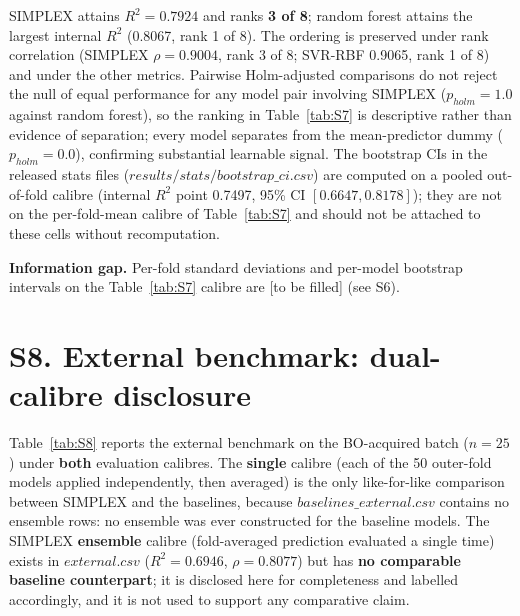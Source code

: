 \documentclass[utf8]{frontiers_suppmat}
\begin{document}
SIMPLEX attains $R^2 = 0.7924$ and ranks \textbf{3 of 8}; random forest attains the largest internal $R^2$ (0.8067, rank 1 of 8). The ordering is preserved under rank correlation (SIMPLEX $\rho = 0.9004$, rank 3 of 8; SVR-RBF 0.9065, rank 1 of 8) and under the other metrics. Pairwise Holm-adjusted comparisons do not reject the null of equal performance for any model pair involving SIMPLEX ($p_{holm} = 1.0$ against random forest), so the ranking in Table~\ref{tab:S7} is descriptive rather than evidence of separation; every model separates from the mean-predictor dummy ($p_{holm} = 0.0$), confirming substantial learnable signal. The bootstrap CIs in the released stats files ($results/stats/bootstrap\_ci.csv$) are computed on a pooled out-of-fold calibre (internal $R^2$ point 0.7497, 95\% CI $[0.6647, 0.8178]$); they are not on the per-fold-mean calibre of Table~\ref{tab:S7} and should not be attached to these cells without recomputation.

\textbf{Information gap.} Per-fold standard deviations and per-model bootstrap intervals on the Table~\ref{tab:S7} calibre are {[}to be filled{]} (see S6).

\section{S8. External benchmark: dual-calibre disclosure}

Table~\ref{tab:S8} reports the external benchmark on the BO-acquired batch ($n = 25$) under \textbf{both} evaluation calibres. The \textbf{single} calibre (each of the 50 outer-fold models applied independently, then averaged) is the only like-for-like comparison between SIMPLEX and the baselines, because $baselines\_external.csv$ contains no ensemble rows: no ensemble was ever constructed for the baseline models. The SIMPLEX \textbf{ensemble} calibre (fold-averaged prediction evaluated a single time) exists in $external.csv$ ($R^2 = 0.6946$, $\rho = 0.8077$) but has \textbf{no comparable baseline counterpart}; it is disclosed here for completeness and labelled accordingly, and it is not used to support any comparative claim.
\end{document}
